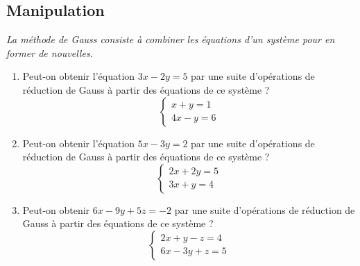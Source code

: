 
\newpage
\vspace{2em}

\subsection{Manipulation}

\textit{La méthode de Gauss consiste à combiner les équations d'un système pour en former de nouvelles.}

\medskip
\begin{enumerate}[label=\alph*)]
\item Peut-on obtenir l'équation \(3x - 2y = 5\) par une suite d'opérations de réduction de Gauss à partir des équations de ce système ?
\[
\begin{cases}
x + y = 1 \\
4x - y = 6
\end{cases}
\]

\item Peut-on obtenir l'équation \(5x - 3y = 2\) par une suite d'opérations de réduction de Gauss à partir des équations de ce système ?
\[
\begin{cases}
2x + 2y = 5 \\
3x + y = 4
\end{cases}
\]

\item Peut-on obtenir \(6x - 9y + 5z = -2\) par une suite d'opérations de réduction de Gauss à partir des équations de ce système ?
\[
\begin{cases}
2x + y - z = 4 \\
6x - 3y + z = 5
\end{cases}
\]
\end{enumerate}


